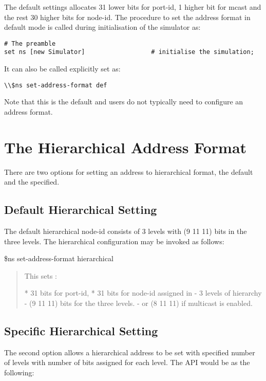 The default settings allocates 31 lower bits for port-id, 1 higher bit
for mcast and the rest 30 higher bits for node-id. The procedure to set
the address format in default mode is called during initialisation of
the simulator as:

\begin{verbatim}
# The preamble
set ns [new Simulator]                  # initialise the simulation;
\end{verbatim}

It can also be called explicitly set as:
\begin{verbatim}
\\$ns set-address-format def
\end{verbatim}

Note that this is the default and users do not typically need to configure
an address format.

\section{The Hierarchical Address Format}
\label{sec:hierFormat}

There are two options for setting an address to hierarchical format, the
default and the specified.

\subsection{Default Hierarchical Setting}
\label{sec:def-hier}
The default hierarchical node-id consists of 3 levels with (9 11 11) bits
in the three levels. The hierarchical configuration may be invoked as
follows: 

\$ns set-address-format hierarchical

\begin{quote}
This sets :

* 31 bits for port-id, 
* 31 bits for node-id assigned in 
  - 3 levels of hierarchy 
  - (9 11 11) bits for the three levels. 
  - or (8 11 11) if multicast is enabled. 
\end{quote}

\subsection{Specific Hierarchical Setting}
\label{sec:sp-hier}
The second option allows a hierarchical address to be set with specified
number of levels with number of bits assigned for each level. The API
would be as the following:

